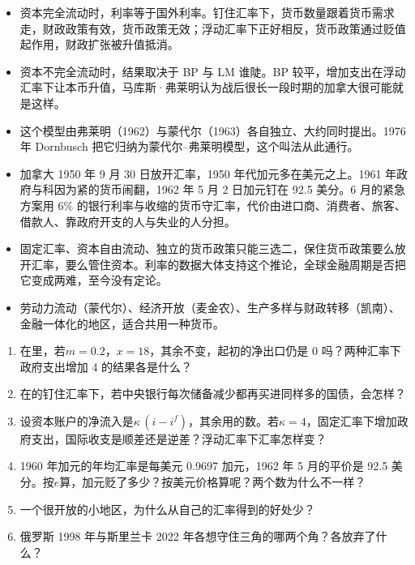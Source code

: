 \begin{takeaways}
\begin{itemize}
\item 资本完全流动时，利率等于国外利率。钉住汇率下，货币数量跟着货币需求走，财政政策有效，货币政策无效；浮动汇率下正好相反，货币政策通过贬值起作用，财政扩张被升值抵消。
\item 资本不完全流动时，结果取决于 BP 与 LM 谁陡。BP 较平，增加支出在浮动汇率下让本币升值，马库斯·弗莱明认为战后很长一段时期的加拿大很可能就是这样。
\item 这个模型由弗莱明（1962）与蒙代尔（1963）各自独立、大约同时提出。1976 年 Dornbusch 把它归纳为蒙代尔–弗莱明模型，这个叫法从此通行。
\item 加拿大 1950 年 9 月 30 日放开汇率，1950 年代加元多在美元之上。1961 年政府与科因为紧的货币闹翻，1962 年 5 月 2 日加元钉在 92.5 美分。6 月的紧急方案用 6\% 的银行利率与收缩的货币守汇率，代价由进口商、消费者、旅客、借款人、靠政府开支的人与失业的人分担。
\item 固定汇率、资本自由流动、独立的货币政策只能三选二，保住货币政策要么放开汇率，要么管住资本。利率的数据大体支持这个推论，全球金融周期是否把它变成两难，至今没有定论。
\item 劳动力流动（蒙代尔）、经济开放（麦金农）、生产多样与财政转移（凯南）、金融一体化的地区，适合共用一种货币。
\end{itemize}
\end{takeaways}

\begin{selfcheck}
\begin{enumerate}
\item 在里，若$m=0.2$，$x=18$，其余不变，起初的净出口仍是 0 吗？两种汇率下政府支出增加 4 的结果各是什么？
\item 在的钉住汇率下，若中央银行每次储备减少都再买进同样多的国债，会怎样？
\item 设资本账户的净流入是$\kappa\,(i-i^{f})$，其余用的数。若$\kappa=4$，固定汇率下增加政府支出，国际收支是顺差还是逆差？浮动汇率下汇率怎样变？
\item 1960 年加元的年均汇率是每美元 0.9697 加元，1962 年 5 月的平价是 92.5 美分。按$e$算，加元贬了多少？按美元价格算呢？两个数为什么不一样？
\item 一个很开放的小地区，为什么从自己的汇率得到的好处少？
\item 俄罗斯 1998 年与斯里兰卡 2022 年各想守住三角的哪两个角？各放弃了什么？
\end{enumerate}
\end{selfcheck}

